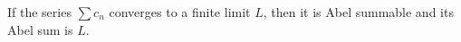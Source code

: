 If the series $\sum c_n$ converges to a finite limit $L$, then it is Abel summable and its Abel sum is $L$.
